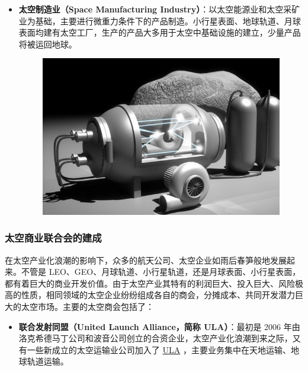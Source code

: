 \documentclass[letterpaper,10pt]{sphinxmanual}
\begin{document}
\begin{itemize}
\item {} 
\textbf{太空制造业（Space Manufacturing Industry）}：以太空能源业和太空采矿业为基础，主要进行微重力条件下的产品制造。小行星表面、地球轨道、月球表面均建有太空工厂，生产的产品大多用于太空中基础设施的建立，少量产品将被运回地球。
\begin{figure}[htbp]
\centering

\includegraphics{future-asteroid-mining-2030s.jpg}
\end{figure}

\end{itemize}


\subsubsection{太空商业联合会的建成}
\label{history:index-17}\label{history:id8}
在太空产业化浪潮的影响下，众多的航天公司、太空企业如雨后春笋般地发展起来。不管是 LEO、GEO、月球轨道、小行星轨道，还是月球表面、小行星表面，都有着巨大的商业开发价值。由于太空产业其特有的利润巨大、投入巨大、风险极高的性质，相同领域的太空企业纷纷组成各自的商会，分摊成本、共同开发潜力巨大的太空市场。主要的太空商会包括了：

\begin{itemize}
\item {} 
\textbf{联合发射同盟（United Launch Alliance，简称 ULA）}：最初是 2006 年由洛克希德马丁公司和波音公司创立的合资企业，太空产业化浪潮到来之际，又有一些新成立的太空运输业公司加入了 \href{http://en.wikipedia.org/wiki/United\_Launch\_Alliance}{ULA} ，主要业务集中在天地运输、地球轨道运输。
\begin{figure}[htbp]
\centering
\end{figure}

\end{itemize}
\end{document}
